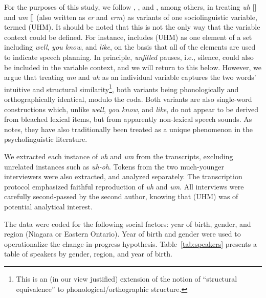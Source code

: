 \documentclass[11pt]{article}
\begin{document}
For the purposes of this study, we follow \textcite{fruehwald2016},
\textcite{wielingetal2016}, and \textcite{tottie2016}, among others, in treating
\emph{uh} [] and \emph{um} [] (also written as \emph{er} and \emph{erm}) as
variants of one sociolinguistic variable, termed (UHM).
It should be noted that this is not the only way that the variable context could
be defined.
For instance, \textcite{tottie2018} includes (UHM) as one element of a set
including \emph{well}, \emph{you know}, and \emph{like}, on the basis that all
of the elements are used to indicate speech planning.
In principle, \emph{unfilled} pauses, i.e., silence, could also be included in
the variable context, and we will return to this below.
However, we argue that treating \emph{um} and \emph{uh} as an individual
variable captures the two words' intuitive and structural similarity\footnote{%
    This is an (in our view justified) extension of the notion of ``structural
    equivalence'' \parencite{pichler2010, tagliamontedenis2010} to
    phonological/orthographic structure.
}, both variants being phonologically and orthographically identical, modulo
the coda.
Both variants are also single-word constructions which, unlike \emph{well},
\emph{you know}, and \emph{like}, do not appear to be derived from bleached
lexical items, but from apparently non-lexical speech sounds.
As \textcite{fruehwald2016} notes, they have also traditionally been treated as
a unique phenomenon in the psycholinguistic literature.


We extracted each instance of \emph{uh} and \emph{um} from the transcripts,
excluding unrelated instances such as \emph{uh-oh}.
Tokens from the two much-younger interviewers were also extracted, and analyzed
separately.
The transcription protocol emphasized faithful reproduction of \emph{uh} and
\emph{um}.
All interviews were carefully second-passed by the second author, knowing that
(UHM) was of potential analytical interest.

The data were coded for the following social factors:
year of birth, gender, and region (Niagara or Eastern Ontario).
Year of birth and gender were used to operationalize the change-in-progress
hypothesis.
Table~\ref{tab:speakers} presents a table of speakers by gender, region, and
year of birth.
\end{document}
